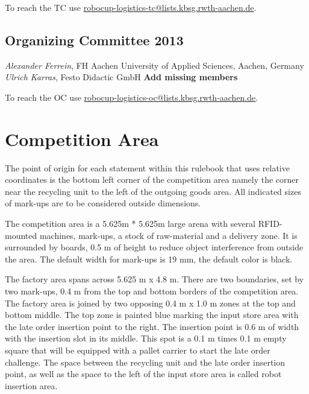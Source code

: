 \documentclass[12pt,twoside]{article}
\begin{document}
\medskip

\hspace{-\parindent}To reach the TC use
\url{robocup-logistics-tc@lists.kbsg.rwth-aachen.de}.

\subsection*{Organizing Committee 2013}
\emph{Alexander Ferrein}, FH Aachen University of Applied Sciences,
Aachen, Germany\\
\emph{Ulrich Karras}, Festo Didactic GmbH
\textbf{Add missing members}

\medskip

\hspace{-\parindent}To reach the OC use
\url{robocup-logistics-oc@lists.kbsg.rwth-aachen.de}.





\section{Competition Area}

The point of origin for each statement within this rulebook that uses
relative coordinates is the bottom left corner of the competition area
namely the corner near the recycling unit to the left of the outgoing
goods area. All indicated sizes of mark-ups are to be considered
outside dimensions.

The competition area is a 5.625m * 5.625m large arena with several
RFID-mounted machines, mark-ups, a stock of raw-material and a
delivery zone. It is surrounded by boards, 0.5 m of height to reduce
object interference from outside the area. The default width for
mark-ups is 19 mm, the default color is black.

The factory area spans across 5.625 m x 4.8 m. There are two
boundaries, set by two mark-ups, 0.4 m from the top and bottom borders
of the competition area. The factory area is joined by two opposing
0.4 m x 1.0 m zones at the top and bottom middle. The top zone is
painted blue marking the input store area with the late order
insertion point to the right. The insertion point is 0.6 m of width
with the insertion slot in its middle. This spot is a 0.1 m times 0.1
m empty square that will be equipped with a pallet carrier to start
the late order challenge. The space between the recycling unit and
the late order insertion point, as well as the space to the left of
the input store area is called robot insertion area.
\end{document}
